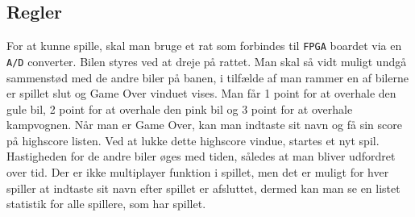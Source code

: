 \subsection{Regler}
For at kunne spille, skal man bruge et rat som forbindes til \texttt{FPGA} boardet via en \texttt{A/D} converter. Bilen styres ved at dreje på rattet.
Man skal så vidt muligt undgå sammenstød med de andre biler på banen, i tilfælde af man rammer en af bilerne er spillet slut og Game Over vinduet vises. Man får 1 point for at overhale den gule bil, 2 point for at overhale den pink bil og 3 point for at overhale kampvognen. Når man er Game Over, kan man indtaste sit navn og få sin score på highscore listen. Ved at lukke dette highscore vindue, startes et nyt spil.
Hastigheden for de andre biler øges med tiden, således at man bliver udfordret over tid. 
Der er ikke multiplayer funktion i spillet, men det er muligt for hver spiller at indtaste sit navn efter spillet er afsluttet, dermed kan man se en listet statistik for alle spillere, som har spillet.  